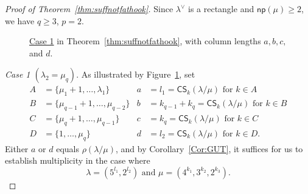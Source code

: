 \documentclass[10pt]{article}
\theoremstyle{definition}
\newcommand{\np}{\mathsf{np}}
\newcommand{\CS	}{\mathsf{CS}}
\let\hypertargeta\hypertarget %
\let\hyperlinka\hyperlink %
\newenvironment{Case}[1]{\par\vskip2pt\noindent%
\emph{#1}.}{\vskip2pt}
\begin{document}
\begin{proof}[Proof of Theorem~\ref{thm:suffnotfathook}] 
Since $\lambda^\vee$ is a rectangle and $\np (\mu) \geq 2$, we have $q\geq 3$, $p=2$.


\begin{figure}[b]\centering
 
 
 \caption[Case 1 in Theorem~\ref{thm:suffnotfathook}, with column lengths $a,b,c,$ and $d$.]{\hyperlinka{Theo3.9case_1}{Case 1} in Theorem~\ref{thm:suffnotfathook}, with column lengths $a,b,c,$ and $d$.}
 \label{case1necessary} 
\end{figure}



\begin{Case}
{\hypertargeta{Theo3.9case_1}{Case 1} $(\lambda_2 = \mu_q)$} 
As illustrated by Figure~\ref{case1necessary}, set
\begin{align*}
A & = \{ \mu_1 + 1,\ldots,\lambda_1 \} & a & = l_1 = \CS _k(\lambda / \mu)\text{ for }k \in A \\
B & = \{ \mu_{q-1} + 1,\ldots,\mu_{q-2} \} & b & = k_{q-1} + k_q = \CS _k(\lambda / \mu)\text{ for }k \in B \\
C & = \{ \mu_{q} + 1,\ldots,\mu_{q-1} \} & c & = k_q = \CS _k(\lambda / \mu)\text{ for }k \in C \\
D & = \{ 1,\ldots,\mu_{q} \} & d & = l_2 = \CS _k(\lambda / \mu)\text{ for }k \in D.
\end{align*}
Either $a$ or $d$ equals $\rho(\lambda/\mu)$, and by Corollary~\ref{Cor:GUT}, it suffices for us to establish multiplicity in the case where
\[
\lambda = (5^{l_1},2^{l_2})\text{ and }\mu = (4^{k_1},3^{k_2},2^{k_3}).
\]


\end{Case}
\end{proof}
\end{document}

